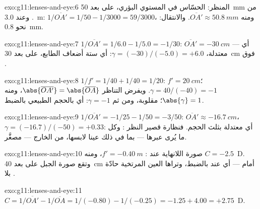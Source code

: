\begin{solution}{exo:g11:lenses-and-eye:6}
المنظر: الحسّاس في المستوي البؤري، على بعد \qty{50}{mm} من . وعند
\qty{3.0}{m}: $1/\overline{OA'} = 1/50 - 1/3000 = 59/3000$، ومنه
$\overline{OA'} \approx \qty{50.8}{mm}$. والانتقال: نحو \qty{0.8}{mm}.
\end{solution}

\begin{solution}{exo:g11:lenses-and-eye:7}
$1/\overline{OA'} = 1/6.0 - 1/5.0 = -1/30$:
$\overline{OA'} = \qty{-30}{cm}$ --- أي  معتدلة،
$\gamma = (-30)/(-5.0) = +6.0$: أي ستة أضعاف الطابع، على بعد \qty{30}{cm}
فوق .
\end{solution}

\begin{solution}{exo:g11:lenses-and-eye:8}
$1/f' = 1/40 + 1/40 = 1/20$: $f' = \qty{20}{cm}$؛
$\gamma = 40/(-40) = -1$. ويفرض التناظر
$\abs{\overline{OA'}} = \abs{\overline{OA}}$، ومنه
$\abs{\gamma} = 1$؛  مقلوبة، ومن ثم $\gamma = -1$:
أي بالحجم الطبيعي بالضبط.
\end{solution}

\begin{solution}{exo:g11:lenses-and-eye:9}
$1/\overline{OA'} = -1/25 - 1/50 = -3/50$:
$\overline{OA'} \approx \qty{-16.7}{cm}$،
$\gamma = (-16.7)/(-50) = +0.33$: أي  معتدلة بثلث
الحجم. فنظارة قصير النظر : وكل ما يُرى عبرها
--- بما في ذلك عينا لابسها، من الخارج --- مصغَّر.
\end{solution}

\begin{solution}{exo:g11:lenses-and-eye:10}
صورة اللانهاية عند : $f' = \qty{-0.40}{m}$، ومنه
$C = -2.5$~D. وتقع صورة الجبل على بعد \qty{40}{cm} أمام
 --- أي عند  بالضبط، وتراها العين المرتخية حادّة
بلا .
\end{solution}

\begin{solution}{exo:g11:lenses-and-eye:11}
$C = 1/\overline{OA'} - 1/\overline{OA} = 1/(-0.80) - 1/(-0.25)
= -1.25 + 4.00 = +2.75$~D.
\end{solution}


